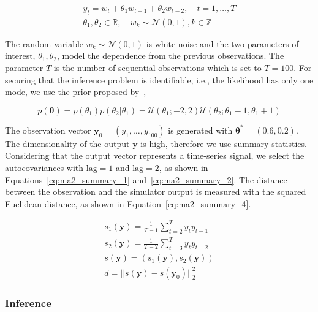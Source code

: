 \documentclass[nojss]{jss}
\newcommand{\yb}{\mathbf{y}}
\newcommand{\thetab}{\boldsymbol{\theta}}
\newcommand{\R}{\mathbb{R}}
\begin{document}
\begin{gather} \label{eq:ma2}
y_t = w_t + \theta_1 w_{t-1} + \theta_2 w_{t-2}, \quad t=1, \ldots, T\\
\theta_1, \theta_2 \in \R, \quad  w_k \sim \mathcal{N}(0,1), k \in \mathbb{Z}
\end{gather}

\noindent
The random variable \(w_{k} \sim \mathcal{N}(0,1) \) is white noise
and the two parameters of interest, \(\theta_1, \theta_2\), model the
dependence from the previous observations. The parameter \(T\) is the
number of sequential observations which is set to \(T=100\). For
securing that the inference problem is identifiable, i.e., the
likelihood has only one mode, we use the prior proposed
by~\cite{Marin2012},

\begin{equation} \label{eq:ma2_prior}
p(\thetab) = p(\theta_1)p(\theta_2|\theta_1)
= \mathcal{U}(\theta_1;-2,2)\mathcal{U}(\theta_2;\theta_1-1, \theta_1+1)
\end{equation}

\noindent
The observation vector \(\yb_0 = (y_1, \ldots, y_{100})\) is generated
with \(\thetab^*=(0.6, 0.2)\). The dimensionality of the output
\(\yb\) is high, therefore we use summary statistics. Considering that
the output vector represents a time-series signal, we select the
autocovariances with \(\mathrm{lag}=1\) and \(\mathrm{lag}=2\), as
shown in Equations~\ref{eq:ma2_summary_1}
and~\ref{eq:ma2_summary_2}. The distance between the observation and
the simulator output is measured with the squared Euclidean distance,
as shown in Equation~\ref{eq:ma2_summary_4}.

\begin{gather}
  \label{eq:ma2_summary_1} s_1(\yb) = \frac{1}{T-1} \sum_{t=2}^T y_ty_{t-1}\\
  \label{eq:ma2_summary_2} s_2(\yb) = \frac{1}{T-2} \sum_{t=3}^T y_ty_{t-2} \\
  s(\yb) = (s_1(\yb), s_2(\yb))\\
  \label{eq:ma2_summary_4} d = ||s(\yb) - s(\yb_0)||_2^2
\end{gather}

\subsubsection*{Inference}
\end{document}
